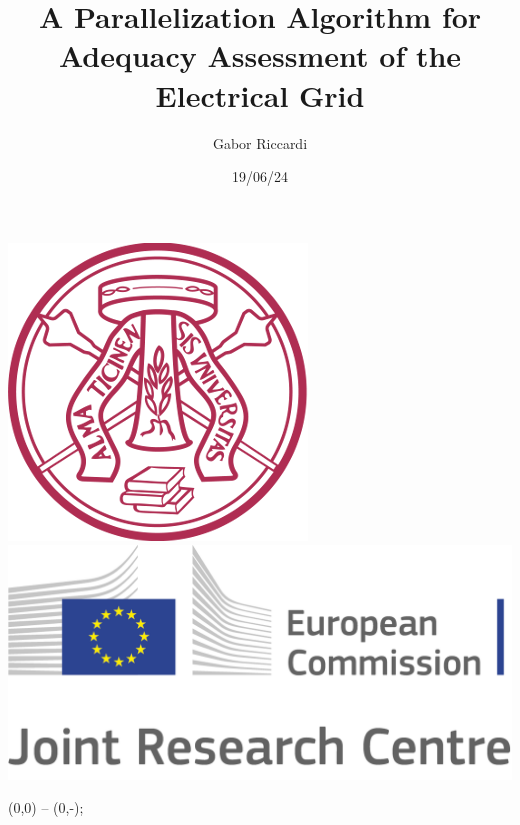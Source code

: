 \documentclass[11pt, aspectratio=169]{beamer}
\title{A Parallelization Algorithm for Adequacy Assessment of the Electrical Grid}
\author{Gabor Riccardi}
\date{19/06/24}
\institute{University of Pavia}
\begin{document}
\begin{frame}[plain]
  \begin{minipage}{0.3\textwidth}
    \centering
    \includegraphics[width=.6\linewidth]{unipv.png}\\[\baselineskip] %
    \includegraphics[width=.8\linewidth]{EC-JRC-logo.png}
  \end{minipage}%
  \begin{minipage}{0.05\textwidth}
      (0,0) -- (0,-\textheight);
  \end{minipage}%
  \begin{minipage}{0.65\textwidth}
    \maketitle
    \centering
  \end{minipage}
\end{frame}

\end{document}
